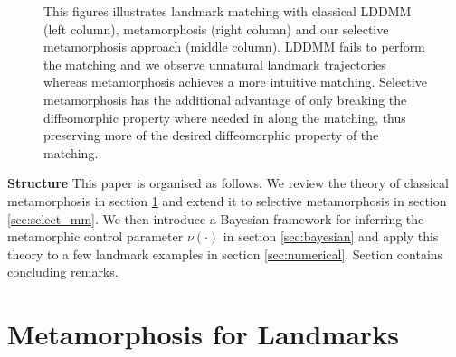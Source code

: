 \documentclass[runningheads]{llncs}
\begin{document}
\begin{figure}
\begin{minipage}{\textwidth}
    \caption{This figures illustrates landmark matching with classical LDDMM
    (left column), metamorphosis (right column) and our selective metamorphosis
    approach (middle column). LDDMM fails to perform the matching and we observe
    unnatural landmark trajectories whereas metamorphosis achieves a more
    intuitive matching. Selective metamorphosis has the additional advantage of
    only breaking the diffeomorphic property where needed in along the matching,
    thus preserving more of the desired diffeomorphic property of the matching.}
    \label{fig:mm_lddmm}
\end{minipage}
\end{figure}

{\bf Structure} This paper is organised as follows. We review the theory of
classical metamorphosis in section \ref{sec:bg} and extend it to selective
metamorphosis in section \ref{sec:select_mm}.  We then introduce a Bayesian
framework for inferring the metamorphic control parameter $\nu(\cdot)$ in
section \ref{sec:bayesian} and apply this theory to a few landmark examples in
section \ref{sec:numerical}. Section \label{sec:outlook} contains concluding
remarks.

\section{Metamorphosis for Landmarks}\label{sec:bg}
\end{document}
